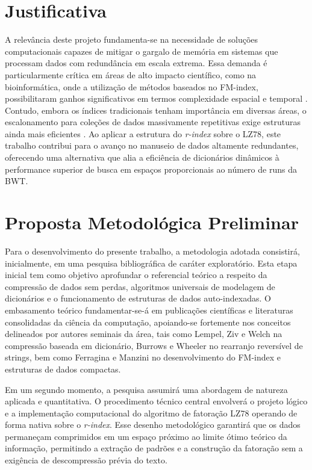 \documentclass[licenciatura]{pre-projeto-computacao}
\begin{document}
\section*{Justificativa}

A relevância deste projeto fundamenta-se na necessidade de soluções computacionais capazes de mitigar o gargalo de memória em sistemas que processam dados com redundância em escala extrema.
Essa demanda é particularmente crítica em áreas de alto impacto científico, como na bioinformática, onde a utilização de métodos baseados no FM-index, possibilitaram ganhos significativos em termos complexidade espacial e temporal \cite{assemblySringGraphFMIndex}.
Contudo, embora os índices tradicionais tenham importância em diversas áreas, o escalonamento para coleções de dados massivamente repetitivas exige estruturas ainda mais eficientes \cite{RefiningRIndex}.
Ao aplicar a estrutura do \textit{r-index} sobre o LZ78, este trabalho contribui para o avanço no manuseio de dados altamente redundantes, oferecendo uma alternativa que alia a eficiência de dicionários dinâmicos à performance superior de busca em espaços proporcionais ao número de runs da BWT.

\section*{Proposta Metodológica Preliminar}

Para o desenvolvimento do presente trabalho, a metodologia adotada consistirá, inicialmente, em uma pesquisa bibliográfica de caráter exploratório.
Esta etapa inicial tem como objetivo aprofundar o referencial teórico a respeito da compressão de dados sem perdas, algoritmos universais de modelagem de dicionários e o funcionamento de estruturas de dados auto-indexadas.
O embasamento teórico fundamentar-se-á em publicações científicas e literaturas consolidadas da ciência da computação, apoiando-se fortemente nos conceitos delineados por autores seminais da área, tais como Lempel, Ziv e Welch na compressão baseada em dicionário, Burrows e Wheeler no rearranjo reversível de strings, bem como Ferragina e Manzini no desenvolvimento do FM-index e estruturas de dados compactas.

Em um segundo momento, a pesquisa assumirá uma abordagem de natureza aplicada e quantitativa.
O procedimento técnico central envolverá o projeto lógico e a implementação computacional do algoritmo de fatoração LZ78 operando de forma nativa sobre o \textit{r-index}.
Esse desenho metodológico garantirá que os dados permaneçam comprimidos em um espaço próximo ao limite ótimo teórico da informação, permitindo a extração de padrões e a construção da fatoração sem a exigência de descompressão prévia do texto.
\end{document}
